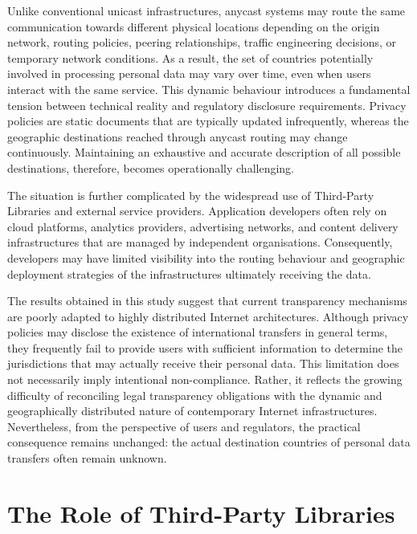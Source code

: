 Unlike conventional unicast infrastructures, anycast systems may route the same communication towards different physical locations depending on the origin network, routing policies, peering relationships, traffic engineering decisions, or temporary network conditions. As a result, the set of countries potentially involved in processing personal data may vary over time, even when users interact with the same service. This dynamic behaviour introduces a fundamental tension between technical reality and regulatory disclosure requirements. Privacy policies are static documents that are typically updated infrequently, whereas the geographic destinations reached through anycast routing may change continuously. Maintaining an exhaustive and accurate description of all possible destinations, therefore, becomes operationally challenging.

The situation is further complicated by the widespread use of Third-Party Libraries and external service providers. Application developers often rely on cloud platforms, analytics providers, advertising networks, and content delivery infrastructures that are managed by independent organisations. Consequently, developers may have limited visibility into the routing behaviour and geographic deployment strategies of the infrastructures ultimately receiving the data.

The results obtained in this study suggest that current transparency mechanisms are poorly adapted to highly distributed Internet architectures. Although privacy policies may disclose the existence of international transfers in general terms, they frequently fail to provide users with sufficient information to determine the jurisdictions that may actually receive their personal data. This limitation does not necessarily imply intentional non-compliance. Rather, it reflects the growing difficulty of reconciling legal transparency obligations with the dynamic and geographically distributed nature of contemporary Internet infrastructures. Nevertheless, from the perspective of users and regulators, the practical consequence remains unchanged: the actual destination countries of personal data transfers often remain unknown.

\section{The Role of Third-Party Libraries}
\label{sc:anycast_experiments_tpls}


